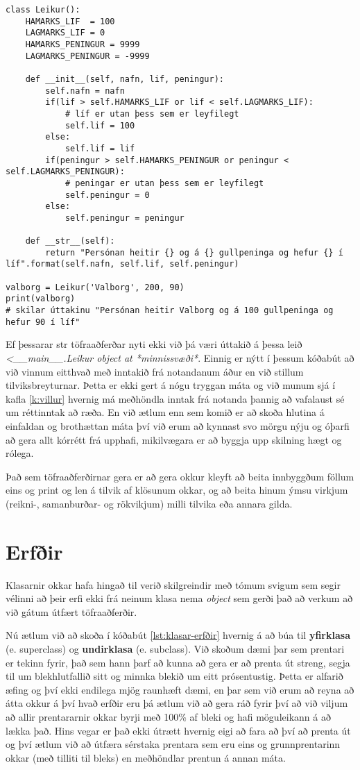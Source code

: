 \begin{lstlisting}[caption=Töfraaðferðin \_\_str\_\_, label=lst:klasar-str]
class Leikur():
	HAMARKS_LIF  = 100
	LAGMARKS_LIF = 0
	HAMARKS_PENINGUR = 9999
	LAGMARKS_PENINGUR = -9999
	
	def __init__(self, nafn, lif, peningur):
		self.nafn = nafn
		if(lif > self.HAMARKS_LIF or lif < self.LAGMARKS_LIF):
			# líf er utan þess sem er leyfilegt
			self.lif = 100
		else:
			self.lif = lif
		if(peningur > self.HAMARKS_PENINGUR or peningur < self.LAGMARKS_PENINGUR):
			# peningar er utan þess sem er leyfilegt
			self.peningur = 0
		else:
			self.peningur = peningur
	
	def __str__(self):
		return "Persónan heitir {} og á {} gullpeninga og hefur {} í líf".format(self.nafn, self.lif, self.peningur)

valborg = Leikur('Valborg', 200, 90)
print(valborg)
# skilar úttakinu "Persónan heitir Valborg og á 100 gullpeninga og hefur 90 í líf"
\end{lstlisting}

Ef þessarar str töfraaðferðar nyti ekki við þá væri úttakið á þessa leið \textit{<\_\_main\_\_.Leikur object at *minnissvæði*}.
Einnig er nýtt í þessum kóðabút að við vinnum eitthvað með inntakið frá notandanum áður en við stillum tilviksbreyturnar.
Þetta er ekki gert á nógu tryggan máta og við munum sjá í kafla \ref{k:villur} hvernig má meðhöndla inntak frá notanda þannig að vafalaust sé um réttinntak að ræða.
En við ætlum enn sem komið er að skoða hlutina á einfaldan og brothættan máta því við erum að kynnast svo mörgu nýju og óþarfi að gera allt kórrétt frá upphafi, mikilvægara er að byggja upp skilning hægt og rólega.

Það sem töfraaðferðirnar gera er að gera okkur kleyft að beita innbyggðum föllum eins og print og len á tilvik af klösunum okkar, og að beita hinum ýmsu virkjum (reikni-, samanburðar- og rökvikjum) milli tilvika eða annara gilda.




\section{Erfðir}\label{uk:klasar-erfðir}
Klasarnir okkar hafa hingað til verið skilgreindir með tómum svigum sem segir vélinni að þeir erfi ekki frá neinum klasa nema \textit{object} sem gerði það að verkum að við gátum útfært töfraaðferðir.

Nú ætlum við að skoða í kóðabút \ref{lst:klasar-erfðir} hvernig á að búa til \textbf{yfirklasa} (e. superclass) og \textbf{undirklasa} (e. subclass).
Við skoðum dæmi þar sem prentari er tekinn fyrir, það sem hann þarf að kunna að gera er að prenta út streng, segja til um blekhlutfallið sitt og minnka blekið um eitt prósentustig.
Þetta er alfarið æfing og því ekki endilega mjög raunhæft dæmi, en þar sem við erum að reyna að átta okkur á því hvað erfðir eru þá ætlum við að gera ráð fyrir því að við viljum að allir prentararnir okkar byrji með 100\% af bleki og hafi möguleikann á að lækka það.
Hins vegar er það ekki útrætt hvernig eigi að fara að því að prenta út og því ætlum við að útfæra sérstaka prentara sem eru eins og grunnprentarinn okkar (með tilliti til bleks) en meðhöndlar prentun á annan máta.

